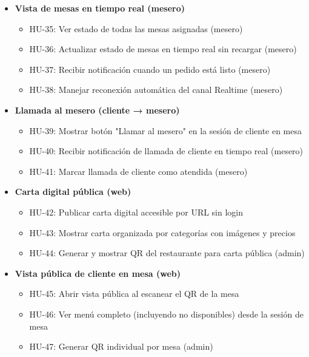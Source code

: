 \begin{itemize}[leftmargin=1.5em]

\item \textbf{Vista de mesas en tiempo real (mesero)}

\begin{itemize}
\item HU-35: Ver estado de todas las mesas asignadas (mesero)
\item HU-36: Actualizar estado de mesas en tiempo real sin recargar (mesero)
\item HU-37: Recibir notificación cuando un pedido está listo (mesero)
\item HU-38: Manejar reconexión automática del canal Realtime (mesero)
\end{itemize}

\item \textbf{Llamada al mesero (cliente → mesero)}

\begin{itemize}
\item HU-39: Mostrar botón "Llamar al mesero" en la sesión de cliente en mesa
\item HU-40: Recibir notificación de llamada de cliente en tiempo real (mesero)
\item HU-41: Marcar llamada de cliente como atendida (mesero)
\end{itemize}

\item \textbf{Carta digital pública (web)}

\begin{itemize}
\item HU-42: Publicar carta digital accesible por URL sin login
\item HU-43: Mostrar carta organizada por categorías con imágenes y precios
\item HU-44: Generar y mostrar QR del restaurante para carta pública (admin)
\end{itemize}

\item \textbf{Vista pública de cliente en mesa (web)}

\begin{itemize}
\item HU-45: Abrir vista pública al escanear el QR de la mesa
\item HU-46: Ver menú completo (incluyendo no disponibles) desde la sesión de mesa
\item HU-47: Generar QR individual por mesa (admin)
\end{itemize}


\end{itemize}
